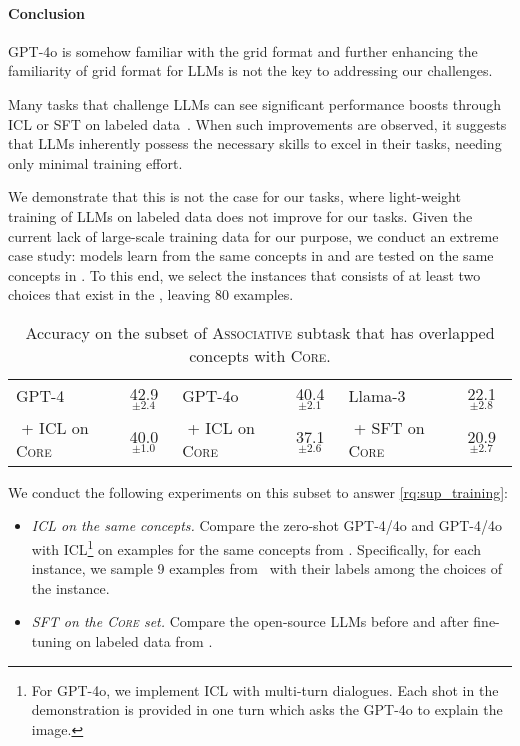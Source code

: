 {\paragraph{Conclusion} GPT-4o is somehow familiar with the grid format and further enhancing the familiarity of grid format for LLMs is not the key to addressing our challenges.

}

\label{rq:sup_training}

Many tasks that challenge LLMs can see significant performance boosts through ICL or SFT on labeled data~\cite{hessel-etal-2023-androids,yu2023personality,berglund2023reversal}. 
When such improvements are observed, it suggests that LLMs inherently possess the necessary skills to excel in their tasks, needing only minimal training effort.

We demonstrate that this is not the case for our tasks, where light-weight training of LLMs on labeled data does not improve for our tasks. Given the current lack of large-scale training data for our purpose, we conduct an extreme case study: models learn from the same concepts in \coredataset and are tested on the same concepts in \harddatasetns.
To this end, we select the instances that consists of at least two choices that exist in the \coredatasetns, leaving 80 examples.

\begin{table*}[t!]
    \small
    \centering
    \begin{tabular}{lc||lc||lc}
    \toprule
    GPT-4 & 42.9$_{\pm\text{2.4}}$ & GPT-4o & 40.4$_{\pm\text{2.1}}$ & Llama-3 & 22.1$_{\pm\text{2.8}}$ \\
    \,\,+ ICL on \textsc{Core}  &40.0$_{\pm\text{1.0}}$ & \,\,+ ICL on \textsc{Core}  &37.1$_{\pm\text{2.6}}$ &\,\,+ SFT on \textsc{Core} & 20.9$_{\pm\text{2.7}}$  \\
    \bottomrule
    \end{tabular}
    \caption{Accuracy on the subset of \textsc{Associative} subtask that has overlapped concepts with \textsc{Core}.}\label{tab:performance_sup_training}
    \vspace{-0.2in}
\end{table*}

We conduct the following experiments on this subset to answer \ref{rq:sup_training}:

\begin{itemize}[noitemsep,nolistsep,leftmargin=*]
    \item \emph{ICL on the same concepts. } Compare the zero-shot GPT-4/4o and GPT-4/4o with ICL\footnote{For GPT-4o, we implement ICL with multi-turn dialogues. Each shot in the demonstration is provided in one turn which asks the GPT-4o to explain the image.} on examples for the same concepts from \coredatasetns. Specifically, for each instance, we sample 9 examples from \coredatasetns\ with their labels among the choices of the instance.
    \item \emph{SFT on the \textsc{Core} set. } Compare the open-source LLMs before and after fine-tuning on labeled data from \coredatasetns.
\end{itemize}


